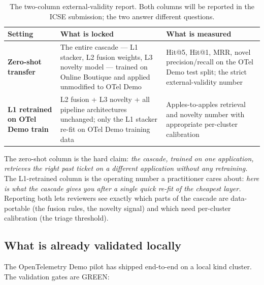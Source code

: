 \begin{table}[h]
\centering
\caption{The two-column external-validity report. Both columns will be reported in the ICSE submission; the two answer different questions.}
\label{tab:cross-app-headline}
\small
\begin{tabularx}{\linewidth}{l X X}
\toprule
Setting & What is locked & What is measured \\
\midrule
\textbf{Zero-shot transfer} & The entire cascade --- L1 stacker, L2 fusion weights, L3 novelty model --- trained on Online Boutique and applied unmodified to OTel Demo & Hit@5, Hit@1, MRR, novel precision/recall on the OTel Demo test split; the strict external-validity number \\
\textbf{L1 retrained on OTel Demo train} & L2 fusion + L3 novelty + all pipeline architectures unchanged; only the L1 stacker re-fit on OTel Demo training data & Apples-to-apples retrieval and novelty number with appropriate per-cluster calibration \\
\bottomrule
\end{tabularx}
\end{table}

The zero-shot column is the hard claim: \emph{the cascade, trained on one application, retrieves the right past ticket on a different application without any retraining.} The L1-retrained column is the operating number a practitioner cares about: \emph{here is what the cascade gives you after a single quick re-fit of the cheapest layer.} Reporting both lets reviewers see exactly which parts of the cascade are data-portable (the fusion rules, the novelty signal) and which need per-cluster calibration (the triage threshold).

\subsection{What is already validated locally}

The OpenTelemetry Demo pilot has shipped end-to-end on a local kind cluster. The validation gates are GREEN:

